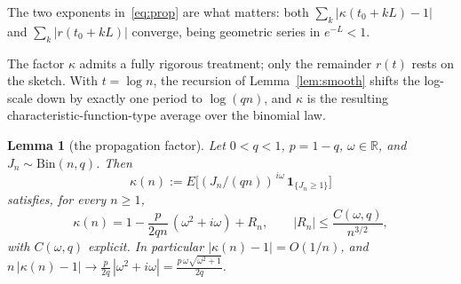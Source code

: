 \documentclass[11pt]{article}
\newtheorem{lemma}[theorem]{Lemma}
\theoremstyle{definition}
\begin{document}
The two exponents in~\eqref{eq:prop} are what matters: both
$\sum_k|\kappa(t_0+kL)-1|$ and $\sum_k|r(t_0+kL)|$ converge, being
geometric series in $e^{-L}<1$.

The factor $\kappa$ admits a fully rigorous treatment; only the
remainder $r(t)$ rests on the sketch. With $t=\log n$, the recursion
of Lemma~\ref{lem:smooth} shifts the log-scale down by exactly one
period to $\log(qn)$, and $\kappa$ is the resulting
characteristic-function-type average over the binomial law.

\begin{lemma}[the propagation factor]\label{lem:kappa}
  Let $0<q<1$, $p=1-q$, $\omega\in\mathbb R$, and
  $J_n\sim\mathrm{Bin}(n,q)$. Then
  \[
    \kappa(n):=E\bigl[(J_n/(qn))^{\,i\omega}\,
                      \mathbf 1_{\{J_n\ge1\}}\bigr]
  \]
  satisfies, for every $n\ge1$,
  \[
    \kappa(n)=1-\frac{p}{2qn}\,(\omega^{2}+i\omega)+R_n,
    \qquad |R_n|\le \frac{C(\omega,q)}{n^{3/2}},
  \]
  with $C(\omega,q)$ explicit. In particular $|\kappa(n)-1|=O(1/n)$,
  and $n\,|\kappa(n)-1|\to\frac{p}{2q}\,|\omega^{2}+i\omega|
  =\frac{p\,\omega\sqrt{\omega^{2}+1}}{2q}$.
\end{lemma}
\end{document}
